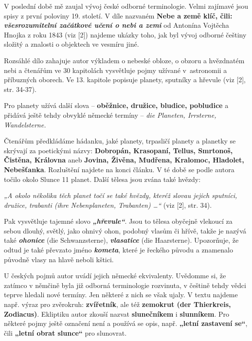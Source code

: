 \documentclass[10pt,a5paper,twoside]{book}
\begin{document}
V poslední době mě zaujal vývoj české odborné terminologie. Velmi zajímavé jsou spisy z první poloviny 19. století. V díle nazvaném \textbf{Nebe a země klíč, čili:  \textit{všesrozumitelní začátkové učení o nebi a zemi}} od Antonína Vojtěcha Hnojka z roku 1843  (viz [2]) najdeme ukázky toho, jak byl vývoj odborné češtiny složitý a znalosti o objektech ve vesmíru jiné.
\par
Rozsáhlé dílo zahajuje autor výkladem o nebeské obloze, o obzoru a hvězdnatém nebi a čtenářům ve 30 kapitolách vysvětluje pojmy užívané v~\hbox{astronomii} a příbuzných oborech. Ve 13.  kapitole popisuje planety, \hbox{sputníky} a hřevule (viz [2], str. 34-37). 
\par
Pro planety užívá další slova – \textbf{oběžnice, družice, bludice, pobludice} a přidává ještě tehdy obvyklé německé termíny – \textit{die Planeten, Irrsterne, Wandelsterne.}
\par
Čtenářům předkládáme hádanku, jaké planety, trpasličí planety a planetky se skrývají za poetickými názvy: \textbf{Dobropán, Krasopaní, Tellus,  Smrtonoš, Čistěna, Královna} aneb \textbf{Jovina, Živěna, Mudřena, Kralomoc, Hladolet, Nebešťanka}. Rozluštění najdete na konci článku.  V té době se podle autora točilo okolo Slunce 11 planet.  Další tělesa jsou zvána také hvězdy:
\par
\textit{„A okolo několika těch planet točí se také hvězdy, kteréž slovau jejich sputníci, družice, trabanti (ihre Nebenplaneten, Trabanten) …“} (viz [2], str. 34).
\par   
Pak vysvětluje tajemné slovo  \textbf{\textit{„hřevule“}}.  Jsou to tělesa obyčejně vlekoucí za sebou dlouhý, světlý, jako ohnivý ohon, podobný vlasům či hřívě, takže je nazývá také \textbf{\textit{ohonice}} (die Schwanzsterne), \textbf{\textit{vlasatice}} (die Haarsterne). Upozorňuje, že odtud je také převzato jméno \textit{\textbf{kometa}}, které je řeckého původu a znamenalo původně vlasy na hlavě neboli kštici.
\par
U českých pojmů autor uvádí jejich německé ekvivalenty. Uvědomme si, že zatímco v němčině byla již odborná terminologie rozvinuta, v češtině tehdy vědci teprve hledali nové  termíny. Jen některé z nich se však ujaly. V textu najdeme např. výraz pro zvěrokruh: \textbf{zvířetník}, ale též \textbf{zemokrut (der Thierkreis, Zodiacus)}. Ekliptiku autor zkouší nazvat \textbf{slunečníkem} i \textbf{slunníkem}. Pro některé pojmy ještě označení není a používá se opis, např. \textbf{„letní zastavení se“}, čili \textbf{„letní obrat slunce“} pro slunovrat. 
\par
\end{document}
